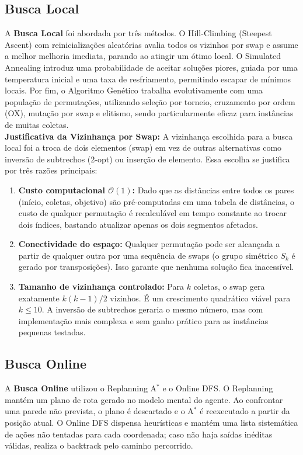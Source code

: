 \documentclass[12pt,a4paper]{article}
\begin{document}
\subsection{Busca Local}
A \textbf{Busca Local} foi abordada por três métodos. O Hill-Climbing (Steepest Ascent) com reinicializações aleatórias avalia todos os vizinhos por swap e assume a melhor melhoria imediata, parando ao atingir um ótimo local. O Simulated Annealing introduz uma probabilidade de aceitar soluções piores, guiada por uma temperatura inicial e uma taxa de resfriamento, permitindo escapar de mínimos locais. Por fim, o Algoritmo Genético trabalha evolutivamente com uma população de permutações, utilizando seleção por torneio, cruzamento por ordem (OX), mutação por swap e elitismo, sendo particularmente eficaz para instâncias de muitas coletas.
\\

\textbf{Justificativa da Vizinhança por Swap:} A vizinhança escolhida para a busca local foi a troca de dois elementos (swap) em vez de outras alternativas como inversão de subtrechos (2-opt) ou inserção de elemento. Essa escolha se justifica por três razões principais:
\begin{enumerate}
    \item \textbf{Custo computacional $\mathcal{O}(1)$:} Dado que as distâncias entre todos os pares (início, coletas, objetivo) são pré-computadas em uma tabela de distâncias, o custo de qualquer permutação é recalculável em tempo constante ao trocar dois índices, bastando atualizar apenas os dois segmentos afetados.
    \item \textbf{Conectividade do espaço:} Qualquer permutação pode ser alcançada a partir de qualquer outra por uma sequência de swaps (o grupo simétrico $S_k$ é gerado por transposições). Isso garante que nenhuma solução fica inacessível.
    \item \textbf{Tamanho de vizinhança controlado:} Para $k$ coletas, o swap gera exatamente $k(k-1)/2$ vizinhos. É um crescimento quadrático viável para $k \le 10$. A inversão de subtrechos geraria o mesmo número, mas com implementação mais complexa e sem ganho prático para as instâncias pequenas testadas.
\end{enumerate}

\subsection{Busca Online}
A \textbf{Busca Online} utilizou o Replanning A$^*$ e o Online DFS. O Replanning mantém um plano de rota gerado no modelo mental do agente. Ao confrontar uma parede não prevista, o plano é descartado e o A$^*$ é reexecutado a partir da posição atual. O Online DFS dispensa heurísticas e mantém uma lista sistemática de ações não tentadas para cada coordenada; caso não haja saídas inéditas válidas, realiza o backtrack pelo caminho percorrido.
\end{document}
